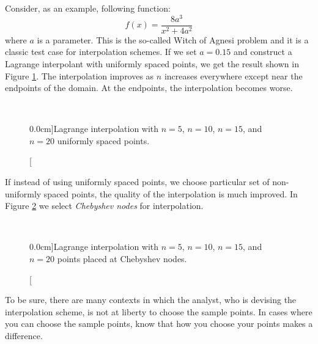 Consider, as an example, following function:
\begin{equation*}
f(x) = \frac{8a^3}{x^2 + 4a^2}
\end{equation*} 
where $a$ is a parameter.  This is the so-called Witch of Agnesi\cite{WOA} problem and it is a classic test case for interpolation schemes.\cite{trefethen2} If we set $a=0.15$ and construct a Lagrange interpolant with uniformly spaced points, we get the result shown in Figure \ref{fig:lec15n-woa-uniform}.  The interpolation improves as $n$ increases everywhere except near the endpoints of the domain.  At the endpoints, the interpolation becomes worse.

\begin{figure}
\\
\label{fig:lec15n-woa-uniform}
\caption[][0.0cm]{Lagrange interpolation with $n=5$, $n=10$, $n=15$, and $n=20$ uniformly spaced points.}
\end{figure}
If instead of using uniformly spaced points, we choose particular set of non-uniformly spaced points, the quality of the interpolation is much improved.  In Figure \ref{fig:lec15n-woa-cheb} we select \emph{Chebyshev nodes} for interpolation. 
\begin{figure}
\\
\label{fig:lec15n-woa-cheb}
\caption[][0.0cm]{Lagrange interpolation with $n=5$, $n=10$, $n=15$, and $n=20$ points placed at Chebyshev nodes.}
\end{figure}
To be sure, there are many contexts in which the analyst, who is devising the interpolation scheme, is not at liberty to choose the sample points. In cases where you can choose the sample points, know that how you choose your points makes a difference.

